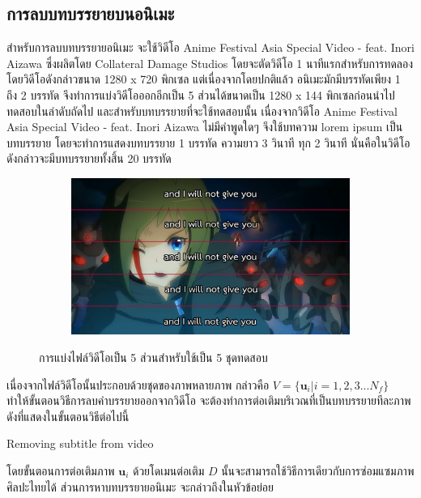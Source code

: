 \documentclass[hidelinks, a4paper,12pt]{article}
\numberwithin{equation}{section}							%
\numberwithin{equation}{section}
\begin{document}
{	
	
	\subsection{การลบบทบรรยายบนอนิเมะ}
	\hspace{1cm} สำหรับการลบบทบรรยายอนิเมะ จะใช้วิดีโอ Anime Festival Asia Special Video - feat. Inori Aizawa ซึ่งผลิตโดย Collateral Damage Studios โดยจะตัดวิดีโอ 1 นาทีแรกสำหรับการทดลอง โดยวิดีโอดังกล่าวขนาด 1280 x 720 พิกเซล แต่เนื่องจากโดยปกติแล้ว อนิเมะมักมีบรรทัดเพียง 1 ถึง 2 บรรทัด จึงทำการแบ่งวิดีโอออกอีกเป็น 5 ส่วนได้ขนาดเป็น 1280 x 144 พิกเซลก่อนนำไปทดสอบในลำดับถัดไป
	\hspace{1cm} และสำหรับบทบรรยายที่จะใช้ทดสอบนั้น เนื่องจากวิดีโอ Anime Festival Asia Special Video - feat. Inori Aizawa ไม่มีคำพูดใดๆ จึงใช้บทความ lorem ipsum เป็นบทบรรยาย โดยจะทำการแสดงบทบรรยาย 1 บรรทัด ความยาว 3 วินาที ทุก 2 วินาที นั่นคือในวิดีโอดังกล่าวจะมีบทบรรยายทั้งสิ้น 20 บรรทัด	
	
	\begin{figure}[H]
		\centering
		\begin{subfigure}{0.8\linewidth}
			\centering
			\includegraphics[width=0.8\linewidth]{images/inori-subbed-preview.png}
		\end{subfigure}
		\caption{การแบ่งไฟล์วิดีโอเป็น 5 ส่วนสำหรับใช้เป็น 5 ชุดทดสอบ}
	\end{figure}
	
	\hspace{1cm}เนื่องจากไฟล์วิดีโอนั้นประกอบด้วยชุดของภาพหลายภาพ กล่าวคือ $V = \{\boldsymbol{u}_i| i = 1,2,3 ... N_f\}$ ทำให้ขั้นตอนวิธีการลบคำบรรยายออกจากวิดีโอ จะต้องทำการต่อเติมบริเวณที่เป็นบทบรรยายทีละภาพ ดังที่แสดงในขั้นตอนวิธีต่อไปนี้ \\
	
	\begin{algorithm}[H]
		\caption{Removing subtitle from video}	
		\SetAlgoNoLine
	\end{algorithm}
	\vspace{1cm}
	\hspace{1cm} โดยขั้นตอนการต่อเติมภาพ $\boldsymbol{u}_i$ ด้วยโดเมนต่อเติม $D$ นั้นจะสามารถใช้วิธีการเดียวกับการซ่อมแซมภาพศิลปะไทยได้ ส่วนการหาบทบรรยายอนิเมะ จะกล่าวถึงในหัวข้อย่อย
	
}
\end{document}
